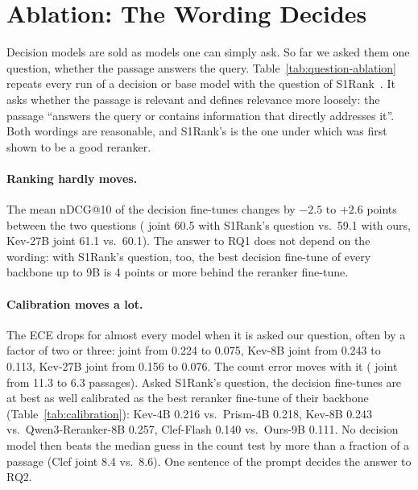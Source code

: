 \section{Ablation: The Wording Decides}
\label{sec:question}



Decision models are sold as models one can simply ask. So far we asked them one question, whether the passage answers
the query. Table~\ref{tab:question-ablation} repeats every run of a decision or base model with the question of
S1Rank~\cite{S1Rank}. It asks whether the passage is relevant and defines relevance more loosely: the passage
``answers the query or contains information that directly addresses it''. Both wordings are reasonable, and S1Rank's
is the one under which \jev{} was first shown to be a good reranker.

\paragraph{Ranking hardly moves.}
The mean nDCG@10 of the decision fine-tunes changes by $-2.5$ to $+2.6$ points between the two questions (\jev{} joint
60.5 with S1Rank's question vs.\ 59.1 with ours, Kev-27B joint 61.1 vs.\ 60.1). The answer to RQ1 does not depend on
the wording: with S1Rank's question, too, the best decision fine-tune of every backbone up to 9B is 4 points or more
behind the reranker fine-tune.

\paragraph{Calibration moves a lot.}
The ECE drops for almost every model when it is asked our question, often by a factor of two or three: \jev{} joint
from 0.224 to 0.075, Kev-8B joint from 0.243 to 0.113, Kev-27B joint from 0.156 to 0.076. The count error moves with
it (\jev{} joint from 11.3 to 6.3 passages). Asked S1Rank's question, the decision fine-tunes are at best as well
calibrated as the best reranker fine-tune of their backbone (Table~\ref{tab:calibration}): Kev-4B 0.216 vs.\ Prism-4B 0.218, Kev-8B
0.243 vs.\ Qwen3-Reranker-8B 0.257, Clef-Flash 0.140 vs.\ Ours-9B 0.111. No decision
model then beats the median guess in the count test by more than a fraction of a passage (Clef joint 8.4 vs.\ 8.6).
One sentence of the prompt decides the answer to RQ2.

